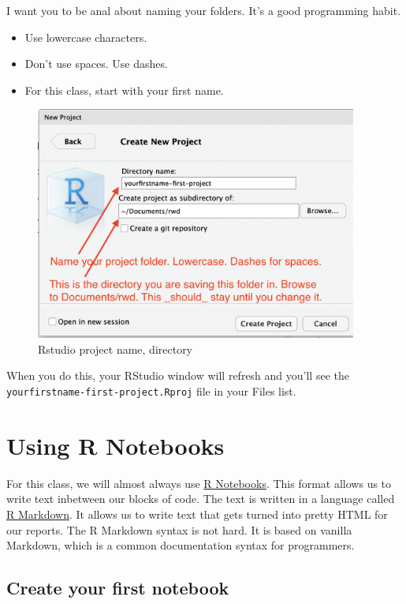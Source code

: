 \documentclass[]{book}
\providecommand{\tightlist}{%
  \setlength{\itemsep}{0pt}\setlength{\parskip}{0pt}}
\begin{document}
I want you to be anal about naming your folders. It's a good programming
habit.

\begin{itemize}
\tightlist
\item
  Use lowercase characters.
\item
  Don't use spaces. Use dashes.
\item
  For this class, start with your first name.
\end{itemize}

\begin{figure}
\centering
\includegraphics[width=4.16667in]{_images/02-rstudio-newproject.png}
\caption{Rstudio project name, directory}
\end{figure}

When you do this, your RStudio window will refresh and you'll see the
\texttt{yourfirstname-first-project.Rproj} file in your Files list.

\section{Using R Notebooks}\label{using-r-notebooks}

For this class, we will almost always use
\href{https://rmarkdown.rstudio.com/lesson-10.html}{R Notebooks}. This
format allows us to write text inbetween our blocks of code. The text is
written in a language called
\href{https://rmarkdown.rstudio.com/lesson-1.html}{R Markdown}. It
allows us to write text that gets turned into pretty HTML for our
reports. The R Markdown syntax is not hard. It is based on vanilla
Markdown, which is a common documentation syntax for programmers.

\subsection{Create your first
notebook}\label{create-your-first-notebook}
\end{document}
